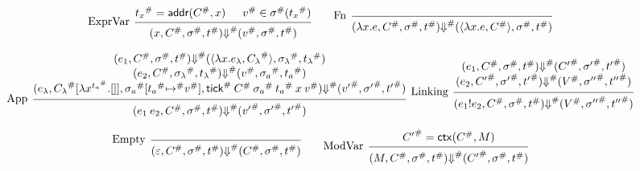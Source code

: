 \documentclass{article}
\theoremstyle{definition}
\newcommand*{\A}[1]{{#1}^{\#}}
\newcommand*{\link}[2]{{#1}\mathtt{!}{#2}}
\newcommand*{\addr}{\mathsf{addr}}
\newcommand*{\tick}{\mathsf{tick}}
\newcommand*{\modctx}{\mathsf{ctx}}
\begin{document}
\[
  \begin{prooftree}
    \hypo{\A{t_{x}}=\addr(\A{C},x)}
    \hypo{\A{v}\in\A{\sigma}(\A{t_{x}})}
    \infer[left label=ExprVar]2{
    (x, \A{C}, \A{\sigma}, \A{t})
    \A{\Downarrow}
    (\A{v}, \A{\sigma}, \A{t})
    }
  \end{prooftree}\qquad
  \begin{prooftree}
    \infer[left label=Fn]0{
    (\lambda x.e, \A{C}, \A{\sigma}, \A{t})
    \A{\Downarrow}
    (\langle\lambda x.e, \A{C}\rangle, \A{\sigma}, \A{t})
    }
  \end{prooftree}
\]

\[
  \begin{prooftree}
    \hypo{
      \begin{matrix}
        (e_{1}, \A{C}, \A{\sigma}, \A{t})
        \A{\Downarrow}
        (\langle\lambda x.e_{\lambda}, \A{C_{\lambda}}\rangle, \A{\sigma_{\lambda}}, \A{t_{\lambda}}) \\
        (e_{2}, \A{C}, \A{\sigma_{\lambda}}, \A{t_{\lambda}})
        \A{\Downarrow}
        (\A{v}, \A{\sigma_{a}}, \A{t_{a}})                                                            \\
        (e_{\lambda}, \A{C_{\lambda}}[\lambda x^{\A{t_{a}}}.[]], \A{\sigma_{a}}[\A{t_{a}}\A{\mapsto} \A{v}], \A{\tick}\:\A{C}\:\A{\sigma_a}\:\A{t_{a}}\:x\:\A{v})
        \A{\Downarrow}
        (\A{v'}, \A{\sigma'},\A{t'})
      \end{matrix}
    }
    \infer[left label={App}]1{
    (e_{1}\:e_{2}, \A{C}, \A{\sigma}, \A{t})
    \A{\Downarrow}
    (\A{v'}, \A{\sigma'},\A{t'})
    }
  \end{prooftree}\:\:
  \begin{prooftree}
    \hypo{
      \begin{matrix}
        (e_{1}, \A{C}, \A{\sigma}, \A{t})
        \A{\Downarrow}
        (\A{C'}, \A{\sigma'}, \A{t'}) \\
        (e_{2}, \A{C'}, \A{\sigma'}, \A{t'})
        \A{\Downarrow}
        (\A{V}, \A{\sigma''}, \A{t''})
      \end{matrix}
    }
    \infer[left label=Linking]1{
    (\link{e_{1}}{e_{2}}, \A{C}, \A{\sigma}, \A{t})
    \A\Downarrow
    (\A{V}, \A{\sigma''}, \A{t''})
    }
  \end{prooftree}
\]

\[
  \begin{prooftree}
    \infer[left label=Empty]0{
    (\varepsilon, \A{C}, \A{\sigma}, \A{t})
    \A{\Downarrow}
    (\A{C}, \A{\sigma}, \A{t})
    }
  \end{prooftree}\qquad
  \begin{prooftree}
    \hypo{\A{C'}=\modctx(\A{C},M)}
    \infer[left label=ModVar]1{
    (M, \A{C}, \A{\sigma}, \A{t})
    \A{\Downarrow}
    (\A{C'}, \A{\sigma}, \A{t})
    }
  \end{prooftree}
\]
\end{document}
